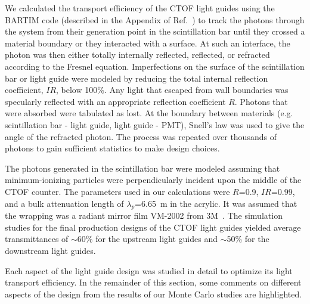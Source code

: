 \documentclass{elsart}
\begin{document}
We calculated the transport efficiency of the CTOF light guides using the BARTIM code
(described in the Appendix of Ref.~\cite{mutch}) to track the photons through the system
from their generation point in the scintillation bar until they crossed a material boundary
or they interacted with a surface. At such an interface, the photon was then either totally 
internally reflected, reflected, or refracted according to the Fresnel equation. Imperfections 
on the surface of the scintillation bar or light guide were modeled by reducing the total 
internal reflection coefficient, $IR$, below 100\%. Any light that escaped from wall boundaries 
was specularly reflected with an appropriate reflection coefficient $R$. Photons that were 
absorbed were tabulated as lost. At the boundary between materials (e.g. scintillation bar - 
light guide, light guide - PMT), Snell's law was used to give the angle of the refracted 
photon. The process was repeated over thousands of photons to gain sufficient statistics to 
make design choices.

The photons generated in the scintillation bar were modeled assuming that minimum-ionizing
particles were perpendicularly incident upon the middle of the CTOF counter. The parameters
used in our calculations were $R$=0.9, $IR$=0.99, and a bulk attenuation length of
$\lambda_p$=6.65~m in the acrylic. It was assumed that the wrapping was a radiant mirror film
VM-2002 from 3M~\cite{3m-ref}. The simulation studies for the final production designs of the
CTOF light guides yielded average transmittances of $\sim$60\% for the upstream light guides
and $\sim$50\% for the downstream light guides.

Each aspect of the light guide design was studied in detail to optimize its light transport 
efficiency. In the remainder of this section, some comments on different aspects of the 
design from the results of our Monte Carlo studies are highlighted.
\end{document}
